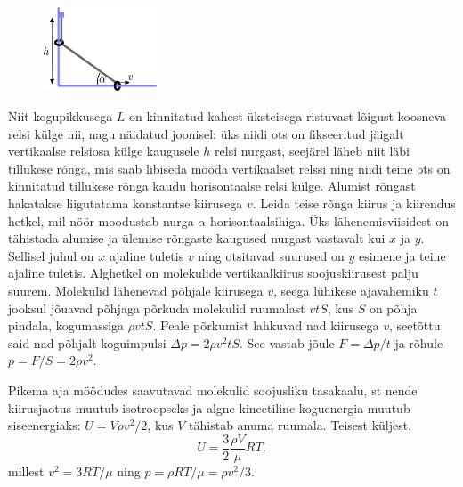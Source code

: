 
\begin{figure}
	\vspace{-5pt}
	\includegraphics[width=0.3\textwidth]{2019-lahg-07-yl.pdf}
\end{figure}

Niit kogupikkusega $L$ on kinnitatud kahest üksteisega ristuvast lõigust koosneva relsi külge nii, nagu näidatud joonisel: üks niidi ots on fikseeritud jäigalt vertikaalse relsiosa külge kaugusele $h$ relsi nurgast, seejärel läheb niit läbi tillukese rõnga, mis saab libiseda mööda vertikaalset relssi ning niidi teine ots on kinnitatud tillukese rõnga kaudu horisontaalse relsi külge. Alumist rõngast hakatakse liigutatama konstantse kiirusega $v$. Leida teise rõnga kiirus ja kiirendus hetkel, mil nöör moodustab nurga $\alpha$ horisontaalsihiga.\hint
Üks lähenemisviisidest on tähistada alumise ja ülemise rõngaste kaugused nurgast vastavalt kui $x$ ja $y$. Sellisel juhul on $x$ ajaline tuletis $v$ ning otsitavad suurused on $y$ esimene ja teine ajaline tuletis.\solu
Alghetkel on molekulide vertikaalkiirus soojuskiirusest palju suurem. Molekulid lähenevad põhjale kiirusega $v$, seega lühikese ajavahemiku $t$ jooksul jõuavad põhjaga põrkuda molekulid ruumalast $vtS$, kus $S$ on põhja pindala, kogumassiga $\rho vtS$. Peale põrkumist lahkuvad nad kiirusega $v$, seetõttu said nad põhjalt koguimpulsi $\Delta p=2\rho v^2tS$. See vastab jõule $F=\Delta p/t$ ja rõhule $p=F/S=2\rho v^2$.

Pikema aja möödudes saavutavad molekulid soojusliku tasakaalu, st nende kiirusjaotus muutub isotroopseks ja algne kineetiline koguenergia muutub siseenergiaks: $U=V\rho v^2/2$, kus $V$ tähistab anuma ruumala. Teisest küljest,
\[
U=\frac 32 \frac{\rho V}\mu RT,
\]
millest $v^2=3 RT/\mu$ ning $p=\rho RT/\mu=\rho v^2/3$.\probend